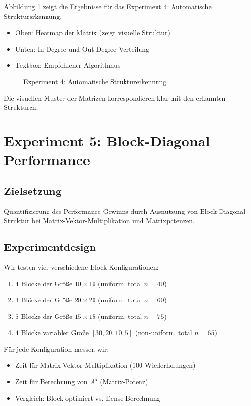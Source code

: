 \documentclass[a4paper,12pt]{report}
\theoremstyle{definition}
\begin{document}
	Abbildung \ref{fig:exp4} zeigt die Ergebnisse für das Experiment 4: Automatische Strukturerkennung.
	\begin{itemize}
		\item Oben: Heatmap der Matrix (zeigt visuelle Struktur)
		\item Unten: In-Degree und Out-Degree Verteilung
		\item Textbox: Empfohlener Algorithmus
	\end{itemize}
	
	\begin{figure}[H]
		\centering
		\caption{Experiment 4: Automatische Strukturerkennung}
		\label{fig:exp4}
	\end{figure}
	
	Die visuellen Muster der Matrizen korrespondieren klar mit den erkannten Strukturen.
	
	\section{Experiment 5: Block-Diagonal Performance}
	
	\subsection{Zielsetzung}
	
	Quantifizierung des Performance-Gewinns durch Ausnutzung von Block-Diagonal-Struktur bei Matrix-Vektor-Multiplikation und Matrixpotenzen.
	
	\subsection{Experimentdesign}
	
	Wir testen vier verschiedene Block-Konfigurationen:
	
	\begin{enumerate}
		\item $4$ Blöcke der Größe $10 \times 10$ (uniform, total $n=40$)
		\item $3$ Blöcke der Größe $20 \times 20$ (uniform, total $n=60$)
		\item $5$ Blöcke der Größe $15 \times 15$ (uniform, total $n=75$)
		\item $4$ Blöcke variabler Größe $[30, 20, 10, 5]$ (non-uniform, total $n=65$)
	\end{enumerate}
	
	Für jede Konfiguration messen wir:
	\begin{itemize}
		\item Zeit für Matrix-Vektor-Multiplikation ($100$ Wiederholungen)
		\item Zeit für Berechnung von $A^5$ (Matrix-Potenz)
		\item Vergleich: Block-optimiert vs. Dense-Berechnung
	\end{itemize}
	
\end{document}
